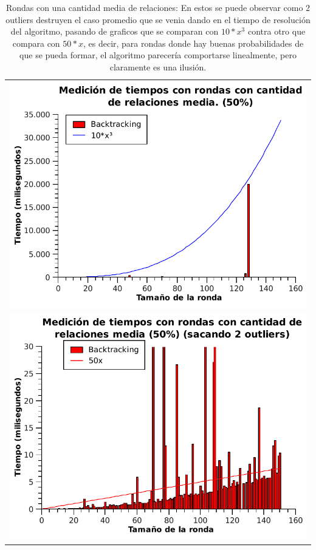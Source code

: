 	\begin{table}[ht] %
		\centering %
			\begin{tabular}{c}
				\includegraphics[scale=0.7]{../Ej_2/Otros/Graficos/Graph50-1.pdf} \\
				\includegraphics[scale=0.7]{../Ej_2/Otros/Graficos/Graph50-2.pdf}
			\end{tabular}
			\caption{Rondas con una cantidad media de relaciones: En estos se puede observar como 2 outliers destruyen el caso promedio que se venia dando en el tiempo de resolución del algoritmo, pasando de graficos que se comparan con $10*x^3$ contra otro que compara con $50*x$, es decir, para rondas donde hay buenas probabilidades de que se pueda formar, el algoritmo parecería comportarse linealmente, pero claramente es una ilusión.} %
			\label{tiempoEj2b} %
	\end{table}

